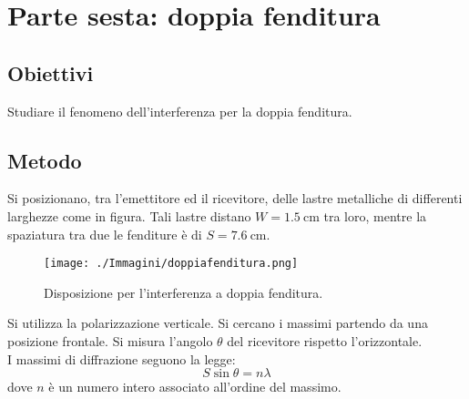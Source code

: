 \documentclass[a4paper]{article}
\begin{document}
\clearpage
\section{Parte sesta: doppia fenditura}
\subsection{Obiettivi}
Studiare il fenomeno dell'interferenza per la doppia fenditura.

\subsection{Metodo}
Si posizionano, tra l'emettitore ed il ricevitore, delle lastre metalliche di differenti larghezze come in figura. Tali lastre distano $W=\SI{1.5}{\cm}$ tra loro, mentre la spaziatura tra due le fenditure è di $S=\SI{7.6}{\cm}$.
\begin{figure}[h]
    \centering
    \texttt{[image: ./Immagini/doppiafenditura.png]}
    \caption[Schema doppia fenditura]{Disposizione per l'interferenza a doppia fenditura.}
\end{figure}
Si utilizza la polarizzazione verticale. Si cercano i massimi partendo da una posizione frontale. Si misura l'angolo $\theta$ del ricevitore rispetto l'orizzontale.\\
I massimi di diffrazione seguono la legge:
\[
	S\sin\theta = n\lambda
\]
dove $n$ è un numero intero associato all'ordine del massimo.
\end{document}
